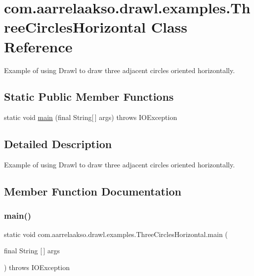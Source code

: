 \hypertarget{classcom_1_1aarrelaakso_1_1drawl_1_1examples_1_1_three_circles_horizontal}{}\section{com.\+aarrelaakso.\+drawl.\+examples.\+Three\+Circles\+Horizontal Class Reference}
\label{classcom_1_1aarrelaakso_1_1drawl_1_1examples_1_1_three_circles_horizontal}


Example of using Drawl to draw three adjacent circles oriented horizontally.  


\subsection*{Static Public Member Functions}
\begin{DoxyCompactItemize}
\item 
static void \hyperlink{classcom_1_1aarrelaakso_1_1drawl_1_1examples_1_1_three_circles_horizontal_a8b70432305be1987703beae7a8776a68}{main} (final String\mbox{[}$\,$\mbox{]} args)  throws I\+O\+Exception 
\end{DoxyCompactItemize}


\subsection{Detailed Description}
Example of using Drawl to draw three adjacent circles oriented horizontally. 

\subsection{Member Function Documentation}
\mbox{\label{classcom_1_1aarrelaakso_1_1drawl_1_1examples_1_1_three_circles_horizontal_a8b70432305be1987703beae7a8776a68}} 
\subsubsection{\texorpdfstring{main()}{main()}}
{\footnotesize\ttfamily static void com.\+aarrelaakso.\+drawl.\+examples.\+Three\+Circles\+Horizontal.\+main (\begin{DoxyParamCaption}\item[{final String \mbox{[}$\,$\mbox{]}}]{args }\end{DoxyParamCaption}) throws I\+O\+Exception\hspace{0.3cm}{\ttfamily [static]}}



